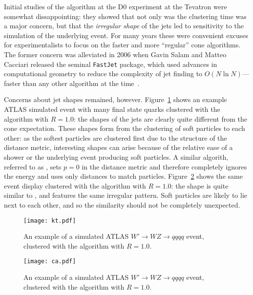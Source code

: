 Initial studies of the \kt algorithm at the D0 experiment at the Tevatron were somewhat dissappointing: they showed that not only was the clustering time was a major concern, but that the \textit{irregular shape} of the \kt jets led to sensitivity to the simulation of the underlying event. For many years these were convenient excuses for experimentalists to focus on the faster and more ``regular'' cone algorithms. The former concern was alleviated in 2006 when Gavin Salam and Matteo Cacciari released the seminal \texttt{FastJet} package, which used advances in computational geometry to reduce the complexity of \kt jet finding to $O(N \ln N)$--- faster than any other algorithm at the time~\cite{fj}. 

Concerns about jet shapes remained, however. Figure~\ref{fig:jets:kt} shows an example ATLAS simulated event with many final state quarks clustered with the \kt algorithm with $R=1.0$: the shapes of the jets are clearly quite different from the cone expectation. These shapes form from the clustering of soft particles to each other: as the softest particles are clustered first due to the structure of the distance metric, interesting shapes can arise because of the relative ease of a shower or the underlying event producing soft particles. A similar algorith, referred to as \CA, sets $p=0$ in the distance metric and therefore completely ignores the energy and uses only distances to match particles. Figure~\ref{fig:jets:ca} shows the same event display clustered with the \CA algorithm with $R=1.0$: the shape is quite similar to \kt, and features the same irregular pattern. Soft particles are likely to lie next to each other, and so the similarity should not be completely unexpected.  %


\begin{figure}
\centering
\texttt{[image: kt.pdf]}
\label{fig:jets:kt}
\caption{An example of a simulated ATLAS $W'\rightarrow WZ\rightarrow qqqq$ event, clustered with the \kt algorithm with $R=1.0$.}
\end{figure}



\begin{figure}
\centering
\texttt{[image: ca.pdf]}
\label{fig:jets:ca}
\caption{An example of a simulated ATLAS $W'\rightarrow WZ\rightarrow qqqq$ event, clustered with the \CA algorithm with $R=1.0$.}
\end{figure}

